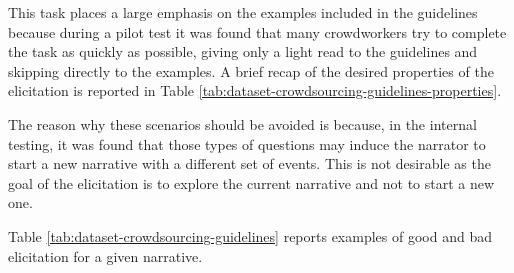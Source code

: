 This task places a large emphasis on the examples included in the guidelines because during a pilot test it was found that many crowdworkers try to complete the task as quickly as possible, giving only a light read to the guidelines and skipping directly to the examples. 
A brief recap of the desired properties of the elicitation is reported in Table \ref{tab:dataset-crowdsourcing-guidelines-properties}.

The reason why these scenarios should be avoided is because, in the internal testing, it was found that those types of questions may induce the narrator to start a new narrative with a different set of events. This is not desirable as the goal of the elicitation is to explore the current narrative and not to start a new one.

Table \ref{tab:dataset-crowdsourcing-guidelines} reports examples of good and bad elicitation for a given narrative. 
